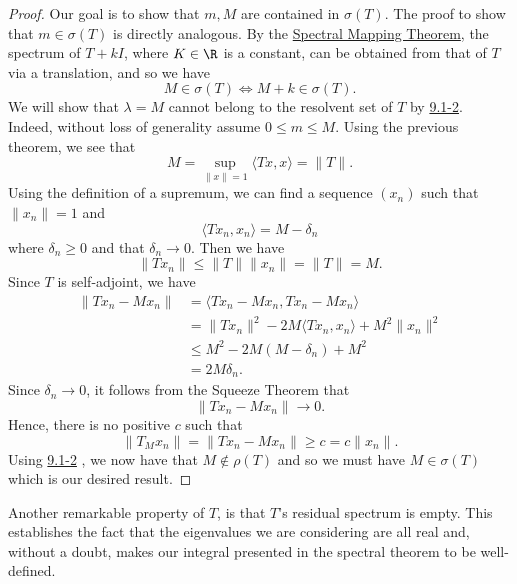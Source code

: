 \begin{proof}
Our goal is to show that \( m,M  \) are contained in \( \sigma(T) \). The proof to show that \( m \in \sigma(T) \) is directly analogous. By the {\hyperref[Spectral Mapping Theorem]{Spectral Mapping Theorem}}, the spectrum of \( T + kI \), where \( K \in \R  \) is a constant, can be obtained from that of \( T  \) via a translation, and so we have 
\[  M \in \sigma(T) \iff M + k \in \sigma(T).  \]
We will show that \( \lambda = M  \) cannot belong to the resolvent set of \( T  \) by {\hyperref[9.1-2]{9.1-2}}. Indeed, without loss of generality assume \( 0 \leq m \leq M  \). Using the previous theorem, we see that 
\[  M = \sup_{\|x\| = 1} \langle Tx , x \rangle = \|T\|. \]
Using the definition of a supremum, we can find a sequence \( ({x}_{n})  \) such that \( \|{x}_{n}\| = 1  \) and 
\[  \langle T {x}_{n} ,  {x}_{n} \rangle = M - \delta_n \]
where \( \delta_n \geq 0  \) and that \( \delta_n \to 0  \). Then we have 
\[  \|T {x}_{n}\| \leq \|T\| \|{x}_{n}\| = \|T\| = M.   \]
Since \( T  \) is self-adjoint, we have
\begin{align*}
    \|T {x}_{n} -  M {x}_{n} \| &= \langle T {x}_{n} - M {x}_{n} ,  T{x}_{n} - M {x}_{n} \rangle \\
                                &= \|T {x}_{n}\|^{2} - 2M \langle T {x}_{n} ,  {x}_{n} \rangle + M^{2} \|{x}_{n}\|^{2} \\
                                &\leq M^{2} - 2M (M - {\delta}_{n}) + M^{2} \\
                                &= 2M {\delta}_{n}.
\end{align*}
Since \( {\delta}_{n} \to 0  \), it follows from the Squeeze Theorem that 
\[  \|T {x}_{n} - M {x}_{n} \| \to 0.  \]
Hence, there is no positive \( c  \) such that 
\[  \|{T}_{M} {x}_{n} \| = \|T {x}_{n} - {Mx}_{n} \| \geq c = c \|{x}_{n}\|. \] 
Using {\hyperref[9.1-2]{9.1-2}} , we now have that \( M \notin \rho(T)  \) and so we must have \( M \in \sigma(T) \) which is our desired result.
\end{proof}


Another remarkable property of \( T  \), is that \( T \)'s residual spectrum is empty. This establishes the fact that the eigenvalues we are considering are all real and, without a doubt, makes our integral presented in the spectral theorem to be well-defined.


